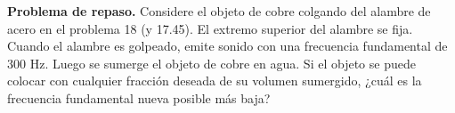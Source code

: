 \item \textbf{Problema de repaso.}
Considere el objeto de cobre colgando del alambre de acero en el problema 18 (y 17.45). El extremo superior del alambre se fija. Cuando el alambre es golpeado, emite sonido con una frecuencia fundamental de $300\text{ Hz}$. Luego se sumerge el objeto de cobre en agua. Si el objeto se puede colocar con cualquier fracción deseada de su volumen sumergido, ¿cuál es la frecuencia fundamental nueva posible más baja?